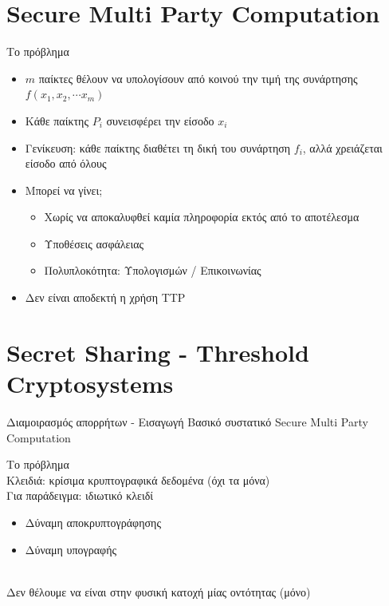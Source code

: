 \documentclass[handout]{beamer}
\begin{document}
\section{Secure Multi Party Computation}
\begin{frame}{Το πρόβλημα}
	\begin{itemize}
		\item $m$ παίκτες θέλουν να υπολογίσουν από κοινού την τιμή της συνάρτησης $f(x_1, x_2, \cdots x_m)$
		\item Κάθε παίκτης $P_i$ συνεισφέρει την είσοδο $x_i$
		\item Γενίκευση: κάθε παίκτης διαθέτει τη δική του συνάρτηση $f_i$, αλλά χρειάζεται είσοδο από όλους
		\item Μπορεί να γίνει;
		\begin{itemize}
			\item Χωρίς να αποκαλυφθεί καμία πληροφορία εκτός από το αποτέλεσμα
			\item Υποθέσεις ασφάλειας
			\item Πολυπλοκότητα: Υπολογισμών / Επικοινωνίας
		\end{itemize}
		\item Δεν είναι αποδεκτή η χρήση TTP
	\end{itemize}
\end{frame}

\section{Secret Sharing - Threshold Cryptosystems}
\begin{frame}{Διαμοιρασμός απορρήτων - Εισαγωγή}
Βασικό συστατικό Secure Multi Party Computation

\alert{Το πρόβλημα}\\
Κλειδιά: κρίσιμα κρυπτογραφικά δεδομένα (όχι τα μόνα)\\
\medskip
\pause
Για παράδειγμα: ιδιωτικό κλειδί
\begin{itemize}
\item Δύναμη αποκρυπτογράφησης
\item Δύναμη υπογραφής
\end{itemize}
\medskip
\pause
{}\\
Δεν θέλουμε να είναι στην φυσική κατοχή μίας οντότητας (μόνο)
\end{frame}
\end{document}
